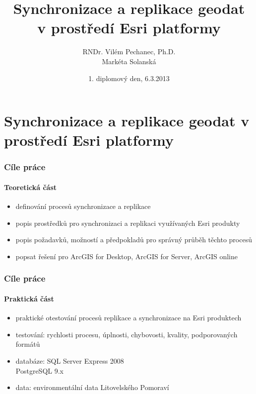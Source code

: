 \documentclass[xcolor=dvipsnames, 14pt]{beamer}
\title[Synchronizace a replikace geodat]{Synchronizace a replikace geodat \\v prostředí Esri platformy}
\author[RNDr. V. Pechanec, Ph.D., M. Solanská]{RNDr. Vilém Pechanec, Ph.D. \\Markéta Solanská}
\date[6.3.2013]{1. diplomový den, 6.3.2013}
\begin{document}

\begin{frame}
  \titlepage
\end{frame}



\section{Synchronizace a replikace geodat v prostředí Esri platformy}

  \begin{frame}
    \frametitle{Cíle práce}
    \framesubtitle{Teoretická část}
    \begin{itemize}
      \item definování procesů synchronizace a replikace
      \item popis prostředků pro synchronizaci a replikaci využívaných Esri produkty
      \item popis požadavků, možností a předpokladů pro správný průběh těchto procesů
      \item popsat řešení pro ArcGIS for Desktop, ArcGIS for Server, ArcGIS online
    \end{itemize}
  \end{frame}

  \begin{frame}
    \frametitle{Cíle práce}
    \framesubtitle{Praktická část}
    \begin{itemize}
      \item praktické otestování procesů replikace a synchronizace na Esri produktech
      \item testování: rychlosti procesu, úplnosti, chybovosti, kvality, podporovaných formátů
      \item databáze: SQL Server Express 2008\\ \hspace{19.5mm} PostgreSQL 9.x
      \item data: environmentální data Litovelského Pomoraví
    \end{itemize}
  \end{frame}
\end{document}
